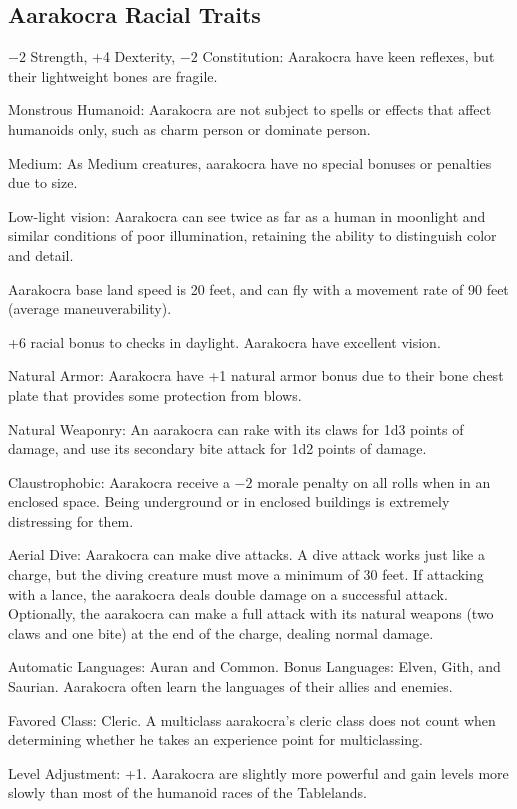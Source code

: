 \subsection{Aarakocra Racial Traits}
\begin{itemize*}
    \item $-2$ Strength, +4 Dexterity, $-2$ Constitution: Aarakocra have keen reflexes, but their lightweight bones are fragile.
    \item Monstrous Humanoid: Aarakocra are not subject to spells or effects that affect humanoids only, such as charm person or dominate person.
    \item Medium: As Medium creatures, aarakocra have no special bonuses or penalties due to size.
    \item Low-light vision: Aarakocra can see twice as far as a human in moonlight and similar conditions of poor illumination, retaining the ability to distinguish color and detail.
    \item Aarakocra base land speed is 20 feet, and can fly with a movement rate of 90 feet (average maneuverability).
    \item +6 racial bonus to  checks in daylight. Aarakocra have excellent vision.
    \item Natural Armor: Aarakocra have +1 natural armor bonus due to their bone chest plate that provides some protection from blows.
    \item Natural Weaponry: An aarakocra can rake with its claws for 1d3 points of damage, and use its secondary bite attack for 1d2 points of damage.
    \item Claustrophobic: Aarakocra receive a $-2$ morale penalty on all rolls when in an enclosed space. Being underground or in enclosed buildings is extremely distressing for them.
    \item Aerial Dive: Aarakocra can make dive attacks. A dive attack works just like a charge, but the diving creature must move a minimum of 30 feet. If attacking with a lance, the aarakocra deals double damage on a successful attack. Optionally, the aarakocra can make a full attack with its natural weapons (two claws and one bite) at the end of the charge, dealing normal damage.
    \item Automatic Languages: Auran and Common. Bonus Languages: Elven, Gith, and Saurian. Aarakocra often learn the languages of their allies and enemies.
    \item Favored Class: Cleric. A multiclass aarakocra's cleric class does not count when determining whether he takes an experience point for multiclassing.
    \item Level Adjustment: +1. Aarakocra are slightly more powerful and gain levels more slowly than most of the humanoid races of the Tablelands.
\end{itemize*}